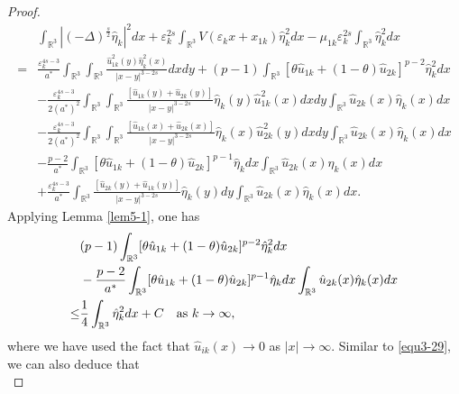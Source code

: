 \documentclass[reqno, 11pt]{amsart} %
\numberwithin{equation}{section}
\begin{document}
\begin{proof}
		\begin{align*} 
			&\int_{\mathbb{R}^{3}}|(-\Delta)^{\frac{s}{2}}\hat{\eta}_{k}|^{2}dx+\varepsilon_{k}^{2s}\int_{\mathbb{R}^{3}}V(\varepsilon_{k}x+x_{1k})\hat{\eta}_{k}^{2}dx-\mu_{1k}\varepsilon_{k}^{2s}\int_{\mathbb{R}^{3}}\hat{\eta}_{k}^{2}dx\\
			=&\frac{\varepsilon_{k}^{4s-3}}{a^{\ast}}\int_{\mathbb{R}^{3}}\int_{\mathbb{R}^{3}}\frac{\hat{u}_{1k}^{2}(y)\hat{\eta}_{k}^{2}(x)}{|x-y|^{3-2s}}dxdy+(p-1)\int_{\mathbb{R}^{3}}[\theta\hat{u}_{1k}+(1-\theta)\hat{u}_{2k}]^{p-2}\hat{\eta}_{k}^{2}dx\\
			&-\frac{\varepsilon_{k}^{4s-3}}{2(a^{\ast})^{2}}\int_{\mathbb{R}^{3}}\int_{\mathbb{R}^{3}}\frac{[\hat{u}_{1k}(y)+\hat{u}_{2k}(y)]}{|x-y|^{3-2s}}\hat{\eta}_{k}(y)\hat{u}^{2}_{1k}(x)dxdy\int_{\mathbb{R}^{3}}\hat{u}_{2k}(x)\hat{\eta}_{k}(x)dx\\
			&-\frac{\varepsilon_{k}^{4s-3}}{2(a^{\ast})^{2}}\int_{\mathbb{R}^{3}}\int_{\mathbb{R}^{3}}\frac{[\hat{u}_{1k}(x)+\hat{u}_{2k}(x)]}{|x-y|^{3-2s}}\hat{\eta}_{k}(x)\hat{u}^{2}_{2k}(y)dxdy\int_{\mathbb{R}^{3}}\hat{u}_{2k}(x)\hat{\eta}_{k}(x)dx\\
			&-\frac{p-2}{a^{\ast}}\int_{\mathbb{R}^{3}}[\theta\hat{u}_{1k}+(1-\theta)\hat{u}_{2k}]^{p-1}\hat{\eta}_{k}dx\int_{\mathbb{R}^{3}}\hat{u}_{2k}(x)\hat{\eta}_{k}(x)dx\\
			&+\frac{\varepsilon_{k}^{4s-3}}{a^{\ast}}\int_{\mathbb{R}^{3}}\frac{[\hat{u}_{2k}(y)+\hat{u}_{1k}(y)]}{|x-y|^{3-2s}}\hat{\eta}_{k}(y)dy\int_{\mathbb{R}^{3}}\hat{u}_{2k}(x)\hat{\eta}_{k}(x)dx.
		\end{align*}
		Applying Lemma \ref{lem5-1}, one has
		\begin{equation}\label{equ4-11}
			\begin{split}
				&(p-1)\int_{\mathbb{R}^{3}}[\theta\hat{u}_{1k}+(1-\theta)\hat{u}_{2k}]^{p-2}\hat{\eta}_{k}^{2}dx\\
				&-\frac{p-2}{a^{\ast}}\int_{\mathbb{R}^{3}}[\theta\hat{u}_{1k}+(1-\theta)\hat{u}_{2k}]^{p-1}\hat{\eta}_{k}dx\int_{\mathbb{R}^{3}}\hat{u}_{2k}(x)\hat{\eta}_{k}(x)dx\\
				\leq& \frac{1}{4}\int_{\mathbb{R}^{3}}\hat{\eta}_{k}^{2}dx+C\quad \hbox{as $k\rightarrow\infty$},
			\end{split}
		\end{equation}
		where we have used the fact that $\hat{u}_{ik}(x)\rightarrow0$ as $|x|\rightarrow\infty$. Similar to \eqref{equ3-29}, we can also deduce that
		\begin{equation}\label{equ4-12}

\end{equation}
\end{proof}
\end{document}
